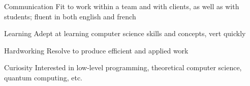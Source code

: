 

\begin{cvskills}

  \cvskill
    {Communication} %
    {Fit to work within a team and with clients, as well as with students; fluent in both english and french}
    
  \cvskill
    {Learning} %
    {Adept at learning computer science skills and concepts, vert quickly}
    
  \cvskill
    {Hardworking} %
    {Resolve to produce efficient and applied work}
    
  \cvskill
    {Curiosity} %
    {Interested in low-level programming, theoretical computer science, quantum computing, etc.}

\end{cvskills}
